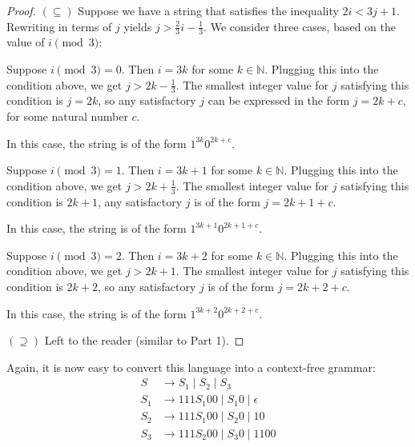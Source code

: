 \documentclass{article}
\begin{document}
    \begin{proof}
        $(\subseteq)$ Suppose we have a string that satisfies the inequality $2i < 3j + 1$. Rewriting in terms of $j$ yields $j > \frac{2}{3}i - \frac{1}{3}$. We consider three cases, based on the value of $i \pmod{3}$:
        
        \begin{Cases}
            \item Suppose $i \pmod{3} = 0$. Then $i = 3k$ for some $k \in \mathbb{N}$. Plugging this into the condition above, we get $j > 2k - \frac{1}{3}$. The smallest integer value for $j$ satisfying this condition is $j = 2k$, so any satisfactory $j$ can be expressed in the form $j = 2k + c$, for some natural number $c$. 
            
            In this case, the string is of the form $1^{3k}0^{2k+c}$.
            \item Suppose $i \pmod{3} = 1$. Then $i = 3k + 1$ for some $k \in \mathbb{N}$. Plugging this into the condition above, we get $j > 2k + \frac{1}{3}$. The smallest integer value for $j$ satisfying this condition is $2k + 1$, any satisfactory $j$ is of the form $j = 2k + 1 + c$.
            
            In this case, the string is of the form $1^{3k + 1}0^{2k + 1 + c}$.
            \item Suppose $i \pmod{3} = 2$. Then $i = 3k + 2$ for some $k \in \mathbb{N}$. Plugging this into the condition above, we get $j > 2k + 1$. The smallest integer value for $j$ satisfying this condition is $2k + 2$, so any satisfactory $j$ is of the form $j = 2k + 2 + c$.
            
            In this case, the string is of the form $1^{3k + 2}0^{2k + 2 + c}$.
        \end{Cases}
        $(\supseteq)$ Left to the reader (similar to Part 1).
    \end{proof}
    Again, it is now easy to convert this language into a context-free grammar: 
    \begin{align*}
        S &\rightarrow S_{1} \mid S_{2} \mid S_{3} \\
        S_{1} &\rightarrow 111S_{1}00 \mid S_{1}0 \mid \epsilon \\
        S_{2} &\rightarrow 111S_{1}00 \mid S_{2}0 \mid 10 \\
        S_{3} &\rightarrow 111S_{2}00 \mid S_{3}0 \mid 1100
    \end{align*}
    
\end{document}
